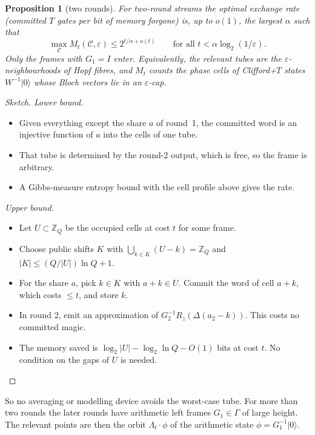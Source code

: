 \documentclass[11pt]{amsart}
\newtheorem{proposition}{Proposition}
\theoremstyle{remark}
\newcommand{\Z}{\mathbb Z}
\begin{document}
\begin{proposition}[two rounds]\label{prop:exact}
For two-round streams the optimal exchange rate (committed $T$ gates per bit of memory forgone) is, up to $o(1)$, the largest $\alpha$ such that
\[
\max_{\mathcal C}M_t(\mathcal C,\varepsilon)\le2^{t/\alpha+o(t)}\qquad\text{for all }t<\alpha\log_2(1/\varepsilon).
\]
Only the frames with $G_1=I$ enter. Equivalently, the relevant tubes are the $\varepsilon$-neighbourhoods of Hopf fibres, and $M_t$ counts the phase cells of Clifford+$T$ \emph{states} $W^{-1}|0\rangle$ whose Bloch vectors lie in an $\varepsilon$-cap.
\end{proposition}
\begin{proof}[Sketch]
\emph{Lower bound.}
\begin{itemize}
\item Given everything except the share $a$ of round~1, the committed word is an injective function of $a$ into the cells of one tube.
\item That tube is determined by the round-2 output, which is free, so the frame is arbitrary.
\item A Gibbs-measure entropy bound with the cell profile above gives the rate.
\end{itemize}
\emph{Upper bound.}
\begin{itemize}
\item Let $U\subset\Z_Q$ be the occupied cells at cost $t$ for some frame.
\item Choose public shifts $K$ with $\bigcup_{k\in K}(U-k)=\Z_Q$ and $|K|\le(Q/|U|)\ln Q+1$.
\item For the share $a$, pick $k\in K$ with $a+k\in U$. Commit the word of cell $a+k$, which costs $\le t$, and store $k$.
\item In round 2, emit an approximation of $G_2^{-1}R_z(\Delta(a_2-k))$. This costs no committed magic.
\item The memory saved is $\log_2|U|-\log_2\ln Q-O(1)$ bits at cost $t$. No condition on the gaps of $U$ is needed.
\end{itemize}
\end{proof}

So no averaging or modelling device avoids the worst-case tube. For more than two rounds the later rounds have arithmetic left frames $G_1\in\Gamma$ of large height. The relevant points are then the orbit $\Lambda_t\cdot\phi$ of the arithmetic state $\phi=G_1^{-1}|0\rangle$.
\end{document}
